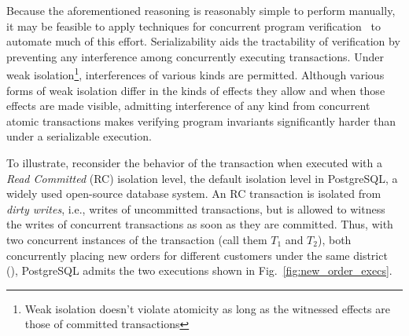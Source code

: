 Because the aforementioned reasoning is reasonably simple to perform
manually, it may be feasible to apply techniques for concurrent
program verification~\cite{....} to automate much of this effort.
Serializability aids the tractability of verification by preventing
any interference among concurrently executing transactions.  Under
weak isolation\footnote{Weak isolation doesn't violate atomicity as
  long as the witnessed effects are those of committed transactions},
interferences of various kinds are permitted.  Although various forms
of weak isolation differ in the kinds of effects they allow and when
those effects are made visible, admitting interference of any kind
from concurrent atomic transactions makes verifying program invariants
significantly harder than under a serializable execution.

To illustrate, reconsider the behavior of the 
transaction when executed with a \emph{Read Committed} (RC) isolation
level, the default isolation level in PostgreSQL, a widely used
open-source database system.  An RC transaction is isolated from
\emph{dirty writes}, i.e., writes of uncommitted transactions, but is
allowed to witness the writes of concurrent transactions as soon as
they are committed. Thus, with two concurrent instances of the
 transaction (call them $T_1$ and $T_2$), both
concurrently placing new orders for different customers under the same
district (), PostgreSQL admits the two executions shown in
Fig.~\ref{fig:new_order_execs}.

